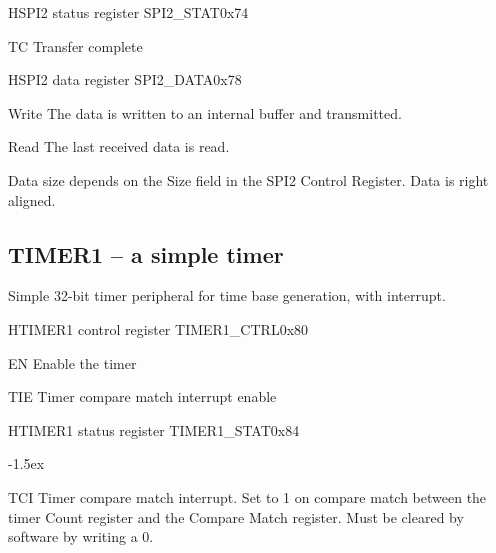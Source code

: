 \documentclass[12pt]{article}
\begin{document}
\begin{register}{H}{SPI2 status register SPI2\_STAT}{0x74}
\label{spi2stat}
%
%
%
\regnewline%
\end{register}
\begin{regdesc}[0.8\textwidth]\begin{reglist}[0000]
\item [TC] Transfer complete
\end{reglist}\end{regdesc}

\begin{register}{H}{SPI2 data register SPI2\_DATA}{0x78}
\label{spi2data}
%
\regnewline%
\end{register}
\begin{regdesc}[0.8\textwidth]\begin{reglist}[000000000]
\item[Write] The data is written to an internal buffer and transmitted.
\item[Read] The last received data is read.
\end{reglist}\end{regdesc}
Data size depends on the Size field in the SPI2 Control Register. Data is right aligned.


\subsection{TIMER1 -- a simple timer}
Simple 32-bit timer peripheral for time base generation, with interrupt.

\begin{register}{H}{TIMER1 control register TIMER1\_CTRL}{0x80}
\label{timer1ctrl}
%
%
%
%
\regnewline%
\end{register}
\begin{regdesc}[0.8\textwidth]\begin{reglist}[0000]
\item[EN] Enable the timer
\item[TIE] Timer compare match interrupt enable
\end{reglist}\end{regdesc}

\begin{register}{H}{TIMER1 status register TIMER1\_STAT}{0x84}
\label{timer1stat}
%
%
%
\regnewline%
\end{register}
\begin{regdesc}[0.8\textwidth]\begin{reglist}[0000]
\itemsep-1.5ex
\item[TCI] Timer compare match interrupt. Set to 1 on compare match between the timer Count register and the Compare Match register. Must be cleared by software by writing a 0.
\end{reglist}\end{regdesc}
\end{document}
